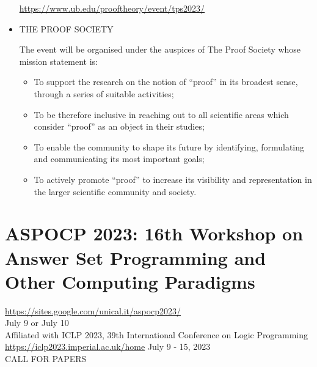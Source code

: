 \documentclass[prodmode,acmtecs]{acmsmall} %
\begin{document}
\begin{itemize}
  \href{https://www.ub.edu/prooftheory/event/tps2023/}{https://www.ub.edu/prooftheory/event/tps2023/} 
 
\item  THE PROOF SOCIETY 
 
  The event will be organised under the auspices of The Proof Society whose mission statement is: 
 
\begin{itemize}\item  To support the research on the notion of “proof” in its broadest sense, through a series of suitable activities;
\item  To be therefore inclusive in reaching out to all scientific areas which consider “proof” as an object in their studies;
\item  To enable the community to shape its future by identifying, formulating and communicating its most important goals;
\item  To actively promote “proof” to increase its visibility and representation in the larger scientific community and society.
\end{itemize} 
\end{itemize}\section{ASPOCP 2023: 16th Workshop on Answer Set Programming and Other Computing Paradigms       }\label{ASPOCP2023}  \href{https://sites.google.com/unical.it/aspocp2023/}{https://sites.google.com/unical.it/aspocp2023/}                   \\ 
  July 9 or July 10                                 \\ 
  Affiliated with ICLP 2023, 39th International Conference on Logic Programming \href{https://iclp2023.imperial.ac.uk/home}{https://iclp2023.imperial.ac.uk/home} July 9 - 15, 2023                                 \\ 
CALL FOR PAPERS 
\end{document}
